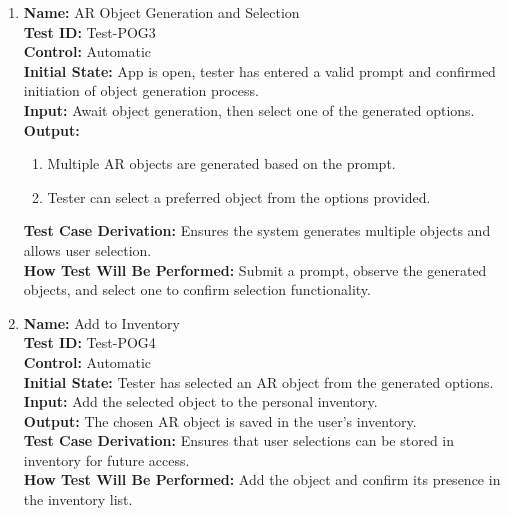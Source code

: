 \documentclass[12pt, titlepage]{article}
\begin{document}
\begin{enumerate}
  \item \textbf{Name:} AR Object Generation and Selection \label{itm:Test-POG3} \\
        \textbf{Test ID:} Test-POG3 \\
        \textbf{Control:} Automatic \\
        \textbf{Initial State:} App is open, tester has entered a valid prompt and confirmed initiation of object generation process. \\
        \textbf{Input:} Await object generation, then select one of the generated options. \\
        \textbf{Output:}
        \begin{enumerate}
          \item Multiple AR objects are generated based on the prompt.
          \item Tester can select a preferred object from the options provided.
        \end{enumerate}
        \textbf{Test Case Derivation:} Ensures the system generates multiple objects and allows user selection. \\
        \textbf{How Test Will Be Performed:} Submit a prompt, observe the generated objects, and select one to confirm selection functionality. \\

  \item \textbf{Name:} Add to Inventory \label{itm:Test-POG4} \\
        \textbf{Test ID:} Test-POG4 \\
        \textbf{Control:} Automatic \\
        \textbf{Initial State:} Tester has selected an AR object from the generated options. \\
        \textbf{Input:} Add the selected object to the personal inventory. \\
        \textbf{Output:} The chosen AR object is saved in the user's inventory. \\
        \textbf{Test Case Derivation:} Ensures that user selections can be stored in inventory for future access. \\
        \textbf{How Test Will Be Performed:} Add the object and confirm its presence in the inventory list. \\


\end{enumerate}
\end{document}
